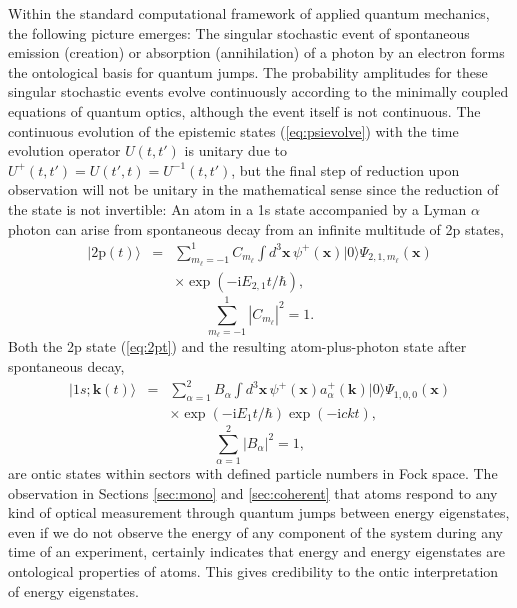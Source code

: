 \documentclass[final,3p,times,twocolumn]{elsarticle3}
\begin{document}
Within the standard computational framework of applied quantum mechanics, 
the following picture emerges:
The singular stochastic event of spontaneous emission (creation) or 
absorption (annihilation) of a photon by an electron forms the ontological
basis for quantum jumps. The probability amplitudes for these singular
stochastic events evolve continuously according to
the minimally coupled equations of quantum optics, although the event
itself is not continuous. The continuous evolution of the epistemic 
states (\ref{eq:psievolve}) with the time evolution operator
$U(t,t')$ is unitary due to $U^+(t,t')=U(t',t)=U^{-1}(t,t')$, 
but the final step of reduction upon observation
will not be unitary in the mathematical sense since the reduction of the
state is not invertible: An atom in a 1s state accompanied by a 
Lyman $\alpha$ photon can arise from spontaneous decay from an infinite 
multitude of 2p states,
\begin{eqnarray} \nonumber
\bm{|}2\mathrm{p}(t)\bm{\rangle}&=&\sum_{m_\ell=-1}^1C_{m_\ell}
\int\!d^3\bm{x}\,\psi^+(\bm{x})\bm{|}0\bm{\rangle}
\Psi_{2,1,m_\ell}(\bm{x})
\\ \label{eq:2pt}
&&\times\exp(-\mathrm{i}E_{2,1}t/\hbar),
\end{eqnarray}
\[
\sum_{m_\ell=-1}^1\left|C_{m_\ell}\right|^2=1.
\]
Both the 2p state (\ref{eq:2pt}) and the resulting atom-plus-photon state
after spontaneous decay,
\begin{eqnarray} \nonumber
\bm{|}1s;\bm{k}(t)\bm{\rangle}&=&\sum_{\alpha=1}^2B_{\alpha}
\int\!d^3\bm{x}\,\psi^+(\bm{x})a^+_{\alpha}(\bm{k})\bm{|}0\bm{\rangle}
\Psi_{1,0,0}(\bm{x})
\\ \label{eq:1sgammat}
&&\times\exp(-\mathrm{i}E_{1}t/\hbar)\exp(-\mathrm{i}ckt),
\end{eqnarray}
\[
\sum_{\alpha=1}^2\left|B_{\alpha}\right|^2=1,
\]
are ontic states within sectors with defined particle numbers in Fock space. 
The observation in Sections \ref{sec:mono} and \ref{sec:coherent} 
that atoms respond to any kind of optical measurement
through quantum jumps between energy eigenstates, even if we do not observe the energy
of any component of the system during any time of an experiment, certainly indicates
that energy and energy eigenstates are ontological properties of atoms. This
gives credibility to the ontic interpretation of energy eigenstates.
\end{document}
